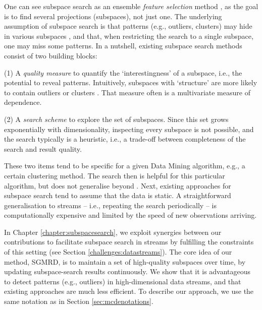 One can see subspace search as an ensemble \textit{feature selection} method \cite{DBLP:journals/jmlr/GuyonE03}, as the goal is to find several projections (subspaces), not just one. 
The underlying assumption of subspace search is that patterns (e.g., outliers, clusters) may hide in various subspaces \cite{DBLP:books/sp/Aggarwal2013}, and that, when restricting the search to a single subspace, one may miss some patterns. 
In a nutshell, existing subspace search methods consist of two building blocks: 

(1) A \textit{quality measure} to quantify the `interestingness' of a subspace, i.e., the potential to reveal patterns. Intuitively, subspaces with `structure' are more likely to contain outliers or clusters \cite{DBLP:phd/dnb/Keller15}. That measure often is a multivariate measure of dependence. 

(2) A \textit{search scheme} to explore the set of subspaces. Since this set grows exponentially with dimensionality, inspecting every subspace is not possible, and the search typically is a heuristic, i.e., a trade-off between completeness of the search and result quality.

These two items tend to be specific for a given Data Mining algorithm, e.g., a certain clustering method. 
The search then is helpful for this particular algorithm, but does not generalise beyond \cite{DBLP:conf/ieeevast/TatuMFBSSK12}. Next, existing approaches for subspace search tend to assume that the data is static. 
A straightforward generalisation to streams -- i.e., repeating the search periodically -- is computationally expensive and limited by the speed of new observations arriving. 

In Chapter \ref{chapter:subspacesearch}, we exploit synergies between our contributions \cite{DBLP:conf/ssdbm/FoucheB19, DBLP:conf/kdd/FoucheKB19, DBLP:conf/ssdbm/FoucheBMKB20} to facilitate subspace search in streams by fulfilling the constraints of this setting (see Section \ref{challenges:datastreams}). %
The core idea of our method, \gls{SGMRD}, is to maintain a set of high-quality subspaces over time, by updating subspace-search results continuously. We show that it is advantageous to detect patterns (e.g., outliers) in high-dimensional data streams, and that existing approaches are much less efficient. To describe our approach, we use the same notation as in Section \ref{sec:mcdenotations}. 


